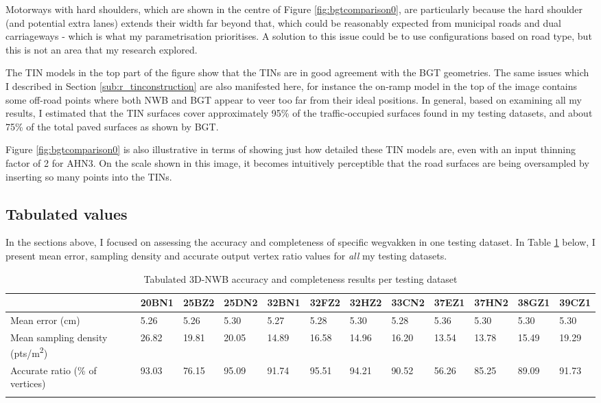 Motorways with hard shoulders, which are shown in the centre of Figure \ref{fig:bgtcomparison0}, are particularly because the hard shoulder (and potential extra lanes) extends their width far beyond that, which could be reasonably expected from municipal roads and dual carriageways - which is what my parametrisation prioritises. A solution to this issue could be to use configurations based on road type, but this is not an area that my research explored.

The TIN models in the top part of the figure show that the TINs are in good agreement with the BGT geometries. The same issues which I described in Section \ref{sub:r_tinconstruction} are also manifested here, for instance the on-ramp model in the top of the image contains some off-road points where both NWB and BGT appear to veer too far from their ideal positions. In general, based on examining all my results, I estimated that the TIN surfaces cover approximately 95\% of the traffic-occupied surfaces found in my testing datasets, and about 75\% of the total paved surfaces as shown by BGT.

Figure \ref{fig:bgtcomparison0} is also illustrative in terms of showing just how detailed these TIN models are, even with an input thinning factor of 2 for AHN3. On the scale shown in this image, it becomes intuitively perceptible that the road surfaces are being oversampled by inserting so many points into the TINs.

\subsection{Tabulated values}
\label{sub:accuracytabulated}

In the sections above, I focused on assessing the accuracy and completeness of specific wegvakken in one testing dataset. In Table \ref{tab:accuracytabulated} below, I present mean error, sampling density and accurate output vertex ratio values for \textit{all} my testing datasets.

\begin{table}[]
\begin{tabular}{@{}llllllllllll@{}}
\toprule
\multicolumn{1}{c}{}                             & 20BN1 & 25BZ2 & 25DN2 & 32BN1 & 32FZ2 & 32HZ2 & 33CN2 & 37EZ1 & 37HN2 & 38GZ1 & 39CZ1 \\ \midrule
Mean error (cm)                                  & 5.26  & 5.26  & 5.30  & 5.27  & 5.28  & 5.30  & 5.28  & 5.36  & 5.30  & 5.30  & 5.30  \\
Mean sampling density (pts/m\textsuperscript{2}) & 26.82 & 19.81 & 20.05 & 14.89 & 16.58 & 14.96 & 16.20 & 13.54 & 13.78 & 15.49 & 19.29 \\
Accurate ratio (\% of vertices)                  & 93.03 & 76.15 & 95.09 & 91.74 & 95.51 & 94.21 & 90.52 & 56.26 & 85.25 & 89.09 & 91.73 \\ \bottomrule
\caption{Tabulated 3D-NWB accuracy and completeness results per testing dataset \label{tab:accuracytabulated}}
\end{tabular}
\end{table}

